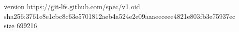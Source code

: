 version https://git-lfs.github.com/spec/v1
oid sha256:3761e8e1cbc8c63e5701812aeb4a524e2e09aaaeeceee4821e803fb3e75937ec
size 699216
